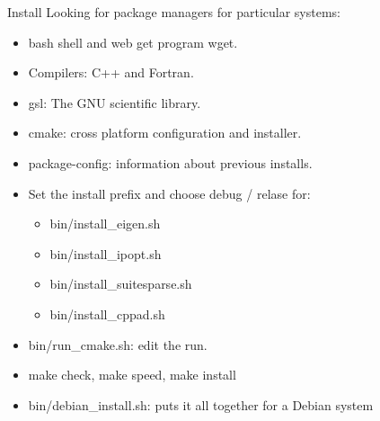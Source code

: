 \documentclass{beamer}
\begin{document}
\begin{frame}{Install}
Looking for package managers for particular systems:
\pause

\begin{itemize}

\item
bash shell and web get program wget.
\pause

\item
Compilers: C++ and Fortran.
\pause

\item
gsl: The GNU scientific library.
\pause

\item
cmake: cross platform configuration and installer.
\pause

\item
package-config: information about previous installs.
\pause

\item
Set the install prefix and choose debug / relase for:
\pause

\begin{itemize}
\item
bin/install\_eigen.sh
\pause
\item
bin/install\_ipopt.sh
\pause
\item
bin/install\_suitesparse.sh
\pause
\item
bin/install\_cppad.sh
\pause
\end{itemize}

\item
bin/run\_cmake.sh: edit the run.
\pause

\item
make check, make speed, make install
\pause

\item
bin/debian\_install.sh: puts it all together for a Debian system
\pause

\end{itemize}
\end{frame}
\end{document}
